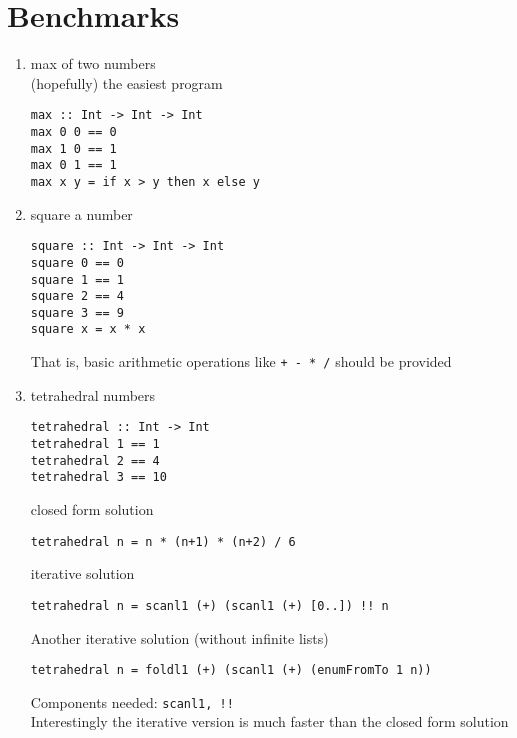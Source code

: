 \chapter{Benchmarks} \label{benchmarks}


\begin{enumerate}
	\item max of two numbers\\
	(hopefully) the easiest program \\
	\begin{lstlisting}
max :: Int -> Int -> Int
max 0 0 == 0
max 1 0 == 1
max 0 1 == 1
max x y = if x > y then x else y
	\end{lstlisting}
%
	\item square a number
	\begin{lstlisting}
square :: Int -> Int -> Int
square 0 == 0
square 1 == 1
square 2 == 4
square 3 == 9
square x = x * x
	\end{lstlisting}
	That is, basic arithmetic operations like \lstinline!+ - * /! should be provided
%
	\item tetrahedral numbers \\
	\begin{lstlisting}
tetrahedral :: Int -> Int
tetrahedral 1 == 1
tetrahedral 2 == 4
tetrahedral 3 == 10
	\end{lstlisting}
	closed form solution
	\begin{lstlisting}
tetrahedral n = n * (n+1) * (n+2) / 6
	\end{lstlisting}
	iterative solution
	\begin{lstlisting}
tetrahedral n = scanl1 (+) (scanl1 (+) [0..]) !! n
	\end{lstlisting}
	Another iterative solution (without infinite lists)
	\begin{lstlisting}
tetrahedral n = foldl1 (+) (scanl1 (+) (enumFromTo 1 n))
	\end{lstlisting}
	Components needed: \lstinline?scanl1, !!? \\
	Interestingly the iterative version is much faster than the closed form solution

\end{enumerate}
